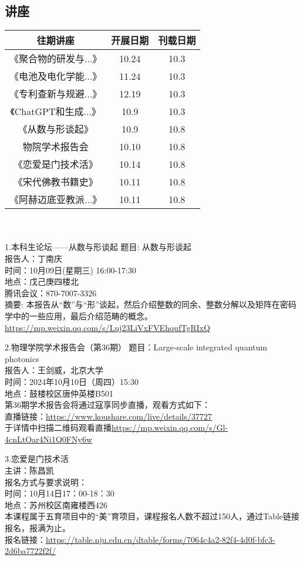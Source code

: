 \documentclass[letterpaper, 12pt]{article}
\begin{document}
\begin{multicols}{2}
\section{讲座}
\begin{tabular}{|c|c|c|}
    \hline
    往期讲座 & 开展日期 & 刊载日期\\
    \hline\hline
    《聚合物的研发与...》 & 10.24 & 10.3\\
    《电池及电化学能...》 & 11.24 & 10.3\\
    《专利查新与规避...》 & 12.19 & 10.3\\
    《ChatGPT和生成...》 & 10.9 & 10.3\\
    《从数与形谈起》 & 10.9 & 10.8\\
    物院学术报告会 & 10.10 & 10.8\\
    《恋爱是门技术活》 & 10.14 & 10.8\\
    《宋代佛教书籍史》 & 10.11 & 10.8\\
    《阿赫迈底亚教派...》 & 10.11 & 10.8\\
      \hline
\end{tabular}\\\\
1.本科生论坛——从数与形谈起
题目: 从数与形谈起\\
报告人：丁南庆\\
时间：10月09日(星期三) 16:00-17:30\\
地点：戊己庚四楼北\\
腾讯会议：870-7007-3326\\
摘要: 本报告从“数”与“形”谈起，然后介绍整数的同余、整数分解以及矩阵在密码学中的一些应用，最后介绍范畴的概念。\url{https://mp.weixin.qq.com/s/Luj23LiVxFVEhqufTgRIxQ}

2.物理学院学术报告会（第36期）
题目：Large-scale integrated quantum photonics\\
报告人：王剑威，北京大学\\
时间：2024年10月10日（周四）15:30\\
地点：鼓楼校区唐仲英楼B501\\
第36期学术报告会将通过寇享同步直播，观看方式如下：\\
直播链接：\url{https://www.koushare.com/live/details/37727}\\
于详情中扫描二维码观看直播\url{https://mp.weixin.qq.com/s/Gl-4cnLtOar4Ni1Q0FNy6w}


3.恋爱是门技术活\\
主讲：陈昌凯\\
报名方式与要求说明：\\
时间：10月14日17：00-18：30\\
地点：苏州校区南雍楼西426\\
本课程属于五育项目中的“美”育项目，课程报名人数不超过150人，通过Table链接报名，报满为止。\\
报名链接：\url{https://table.nju.edu.cn/dtable/forms/7064c4a2-82f4-4d0f-bfc3-2d6ba7722f2f/}\\


\end{multicols}
\end{document}
